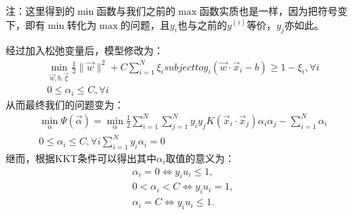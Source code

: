 \documentclass[a4paper,12pt]{article}
\begin{document}
注：这里得到的$\min$函数与我们之前的$\max$函数实质也是一样，因为把符号变下，即有$\min$转化为$\max$的问题，且$y_i$也与之前的$y^{(i)}$等价，$y_j$亦如此。

经过加入松弛变量后，模型修改为：
\begin{equation}
  \begin{split}
    \min_{\vec w,b,\vec \xi}\frac{1}{2}\|\vec w\|^2+C\sum_{i=1}^N\xi_i subject to y_i(\vec w \cdot \vec x_i -b)\geq 1-\xi_i,\forall i\\
    0\leq\alpha_i\leq C,\forall i
  \end{split}
\end{equation}
从而最终我们的问题变为：
\begin{equation}
  \begin{split}
    \min_\alpha\Psi(\vec\alpha)=\min_\alpha\frac{1}{2}\sum_{i=1}^N\sum_{j=1}^Ny_iy_jK(\vec x_i\cdot \vec x_j)\alpha_i\alpha_j-\sum_{i=1}^N\alpha_i\\
    0\leq\alpha_i\leq C,\forall i
    \sum_{i=1}^Ny_i\alpha_i=0
  \end{split}
\end{equation}
继而，根据KKT条件可以得出其中$\alpha_i$取值的意义为：
\begin{equation}
  \begin{split}
    \alpha_i=0 \Leftrightarrow y_iu_i\leq1,\\
    0<\alpha_i<C \Leftrightarrow y_iu_i=1,\\
    \alpha_i=C\Leftrightarrow y_iu_i\leq 1.
  \end{split}
\end{equation}
\end{document}
